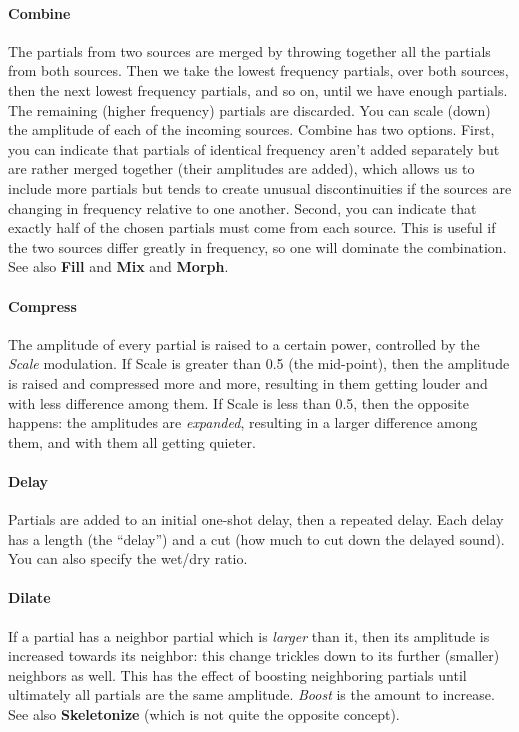 \documentclass{article}
\begin{document}
\paragraph{Combine} The partials from two sources are merged by throwing together all the partials from both sources.  Then we take the lowest frequency partials, over both sources, then the next lowest frequency partials, and so on, until we have enough partials.  The remaining (higher frequency) partials are discarded.  You can scale (down) the amplitude of each of the incoming sources.  Combine has two options.  First, you can indicate that partials of identical frequency aren't added separately but are rather merged together (their amplitudes are added), which allows us to include more partials but tends to create unusual discontinuities if the sources are changing in frequency relative to one another.  Second, you can indicate that exactly half of the chosen partials must come from each source.  This is useful if the two sources differ greatly in frequency, so one will dominate the combination.  See also {\bf Fill} and {\bf Mix} and {\bf Morph}.

\paragraph{Compress}  The amplitude of every partial is raised to a certain power, controlled by the {\it Scale} modulation.  If Scale is greater than 0.5 (the mid-point), then the amplitude is raised and compressed more and more, resulting in them getting louder and with less difference among them.  If Scale is less than 0.5, then the opposite happens: the amplitudes are {\it expanded}, resulting in a larger difference among them, and with them all getting quieter.

\paragraph{Delay}  Partials are added to an initial one-shot delay, then a repeated delay.  Each delay has a length (the ``delay'') and a cut (how much to cut down the delayed sound).  You can also specify the wet/dry ratio.

\paragraph{Dilate} If a partial has a neighbor partial which is {\it larger} than it, then its amplitude is increased towards its neighbor: this change trickles down to its further (smaller) neighbors as well.  This has the effect of boosting neighboring partials until ultimately all partials are the same amplitude.  {\it Boost} is the amount to increase.  See also {\bf Skeletonize} (which is not quite the opposite concept).
\end{document}

